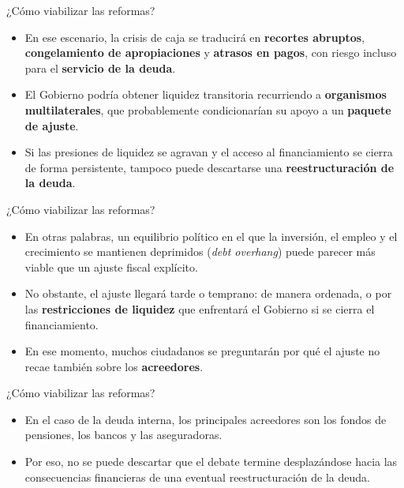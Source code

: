 \begin{frame}{¿Cómo viabilizar las reformas?}
    \begin{itemize}
        \item En ese escenario, la crisis de caja se traducirá en \textbf{recortes abruptos}, \textbf{congelamiento de apropiaciones} y \textbf{atrasos en pagos}, con riesgo incluso para el \textbf{servicio de la deuda}.
        \item El Gobierno podría obtener liquidez transitoria recurriendo a \textbf{organismos multilaterales}, que probablemente condicionarían su apoyo a un \textbf{paquete de ajuste}.
        \item Si las presiones de liquidez se agravan y el acceso al financiamiento se cierra de forma persistente, tampoco puede descartarse una \textbf{reestructuración de la deuda}.
    \end{itemize}
\end{frame}
\begin{frame}{¿Cómo viabilizar las reformas?}
\begin{itemize}
    \item En otras palabras, un equilibrio político en el que la inversión, el empleo y el crecimiento se mantienen deprimidos (\textit{debt overhang}) puede parecer más viable que un ajuste fiscal explícito.
    \item No obstante, el ajuste llegará tarde o temprano: de manera ordenada, o por las \textbf{restricciones de liquidez} que enfrentará el Gobierno si se cierra el financiamiento.
    \item En ese momento, muchos ciudadanos se preguntarán por qué el ajuste no recae también sobre los \textbf{acreedores}.
\end{itemize}
\end{frame}

\begin{frame}{¿Cómo viabilizar las reformas?}
\begin{itemize}
    \item En el caso de la deuda interna, los principales acreedores son los fondos de pensiones, los bancos y las aseguradoras.
    \item Por eso, no se puede descartar que el debate termine desplazándose hacia las consecuencias financieras de una eventual reestructuración de la deuda.
\end{itemize}
\end{frame}

